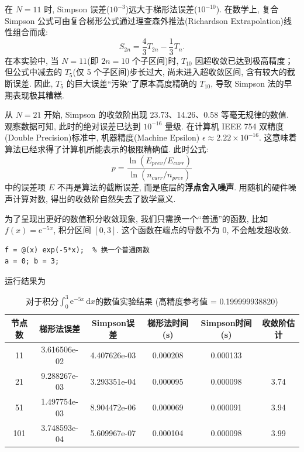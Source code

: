 \documentclass[zihao=-4,a4paper]{ctexart}
\begin{document}

在 $N=11$ 时, Simpson 误差($10^{-3}$)远大于梯形法误差($10^{-10}$). 在数学上, 复合 Simpson 公式可由复合梯形公式通过理查森外推法(Richardson Extrapolation)线性组合而成: 
\begin{equation}
    S_{2n} = \frac{4}{3}T_{2n} - \frac{1}{3}T_n.
\end{equation}
在本实验中, 当 $N=11$(即 $2n=10$ 个子区间)时, $T_{10}$ 因超收敛已达到极高精度；但公式中减去的 $T_5$(仅 5 个子区间)步长过大, 尚未进入超收敛区间, 含有较大的截断误差. 因此, $T_5$ 的巨大误差“污染”了原本高度精确的 $T_{10}$, 导致 Simpson 法的早期表现极其糟糕. 


从 $N=21$ 开始, Simpson 的收敛阶出现 23.73、14.26、0.58 等毫无规律的数值. 
观察数据可知, 此时的绝对误差已达到 $10^{-16}$ 量级. 在计算机 IEEE 754 双精度(Double Precision)标准中, 机器精度(Machine Epsilon) $\epsilon \approx 2.22 \times 10^{-16}$. 
这意味着算法已经求得了计算机所能表示的极限精确值. 此时公式: 
\begin{equation}
    p = \frac{\ln(E_{prev} / E_{curr})}{\ln(n_{curr} / n_{prev})}
\end{equation}
中的误差项 $E$ 不再是算法的截断误差, 而是底层的\textbf{浮点舍入噪声}. 用随机的硬件噪声计算对数, 得出的收敛阶自然失去了数学意义. 


为了呈现出更好的数值积分收敛现象, 我们只需换一个“普通”的函数, 比如 $f(x) = \mathrm{e}^{-5x}$, 积分区间 $[0, 3]$. 这个函数在端点的导数不为 0, 不会触发超收敛.
\begin{lstlisting}
f = @(x) exp(-5*x);  % 换一个普通函数
a = 0; b = 3;
\end{lstlisting}
运行结果为
\begin{table}[H]
\centering
\caption{对于积分$\int_0^3 \mathrm{e}^{-5x} \, \mathrm{d}x$的数值实验结果 (高精度参考值 = 0.199999938820)}
\begin{tabular}{c|c|c|c|c|c}
\hline
节点数 & 梯形法误差 & Simpson误差 & 梯形法时间(s) & Simpson时间(s) & 收敛阶估计 \\ \hline
 11 & 3.616506e-02 & 4.407626e-03 & 0.000208 & 0.000133 &  \\
 21 & 9.288267e-03 & 3.293351e-04 & 0.000095 & 0.000098 & 3.74 \\
 51 & 1.497754e-03 & 8.904472e-06 & 0.000069 & 0.000091 & 3.94 \\
101 & 3.748593e-04 & 5.609967e-07 & 0.000104 & 0.000098 & 3.99 \\ \hline
\end{tabular}
\end{table}
\end{document}
